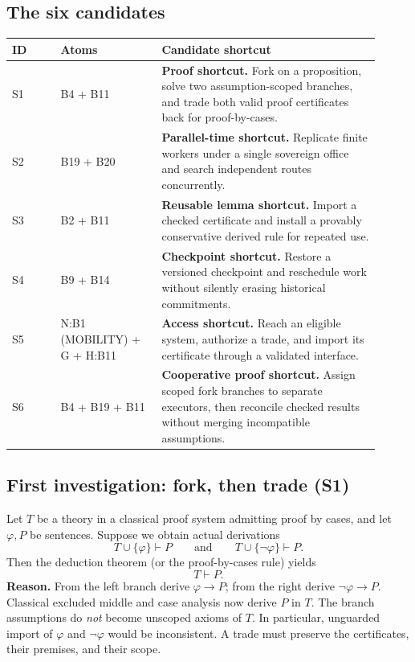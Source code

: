 \documentclass[11pt,letterpaper]{article}
\theoremstyle{definition}\newtheorem{definition}[theorem]{Definition}\newtheorem{example}[theorem]{Example}
\theoremstyle{remark}\newtheorem{remark}[theorem]{Remark}
\begin{document}
\subsection*{The six candidates}
\renewcommand{\arraystretch}{1.23}
\begin{center}\small
\begin{tabular}{@{}p{0.12\linewidth}p{0.25\linewidth}p{0.54\linewidth}@{}}\toprule
\textbf{ID} & \textbf{Atoms} & \textbf{Candidate shortcut}\\\midrule
S1 & B4 + B11 & \textbf{Proof shortcut.} Fork on a proposition, solve two assumption-scoped branches, and trade both valid proof certificates back for proof-by-cases.\\
S2 & B19 + B20 & \textbf{Parallel-time shortcut.} Replicate finite workers under a single sovereign office and search independent routes concurrently.\\
S3 & B2 + B11 & \textbf{Reusable lemma shortcut.} Import a checked certificate and install a provably conservative derived rule for repeated use.\\
S4 & B9 + B14 & \textbf{Checkpoint shortcut.} Restore a versioned checkpoint and reschedule work without silently erasing historical commitments.\\
S5 & N:B1 (MOBILITY) + G + H:B11 & \textbf{Access shortcut.} Reach an eligible system, authorize a trade, and import its certificate through a validated interface.\\
S6 & B4 + B19 + B11 & \textbf{Cooperative proof shortcut.} Assign scoped fork branches to separate executors, then reconcile checked results without merging incompatible assumptions.\\\bottomrule
\end{tabular}
\end{center}

\subsection*{First investigation: fork, then trade (S1)}
Let \(T\) be a theory in a classical proof system admitting proof by cases, and let \(\varphi,P\) be sentences. Suppose we obtain actual derivations
\[
  T\cup\{\varphi\}\vdash P
  \qquad\text{and}\qquad
  T\cup\{\neg\varphi\}\vdash P.
\]
Then the deduction theorem (or the proof-by-cases rule) yields
\[
  \boxed{T\vdash P.}
\]
\textbf{Reason.} From the left branch derive \(\varphi\to P\); from the right derive \(\neg\varphi\to P\). Classical excluded middle and case analysis now derive \(P\) in \(T\). The branch assumptions do \emph{not} become unscoped axioms of \(T\). In particular, unguarded import of \(\varphi\) and \(\neg\varphi\) would be inconsistent. A trade must preserve the certificates, their premises, and their scope.
\end{document}
